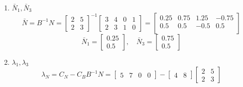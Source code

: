 \documentclass[../../main.tex]{subfiles}
\begin{document}
\begin{solution}
\begin{enumerate}
\begin{equation*}
              \end{equation*}
        \item \(\bar{N}_1,\bar{N}_3\)
              \begin{equation*}
                  \bar{N} = B^{-1}N =
                  \begin{bmatrix}
                      2 & 5 \\
                      2 & 3
                  \end{bmatrix}^{-1}
                  \begin{bmatrix}
                      3 & 4 & 0 & 1 \\
                      2 & 3 & 1 & 0
                  \end{bmatrix}
                  =
                  \begin{bmatrix}
                      0.25 & 0.75 & 1.25 & -0.75 \\
                      0.5  & 0.5  & -0.5 & 0.5   \\
                  \end{bmatrix}
              \end{equation*}
              \begin{equation*}
                  \bar{N}_1 = \begin{bmatrix}
                      0.25 \\
                      0.5
                  \end{bmatrix}
                  ,\quad
                  \bar{N}_3 = \begin{bmatrix}
                      0.75 \\
                      0.5
                  \end{bmatrix}
              \end{equation*}
        \item \(\lambda_1,\lambda_3\)
              \begin{equation*}
                  \lambda_N = C_N - C_BB^{-1}N =
                  \begin{bmatrix}
                      5 & 7 & 0 & 0
                  \end{bmatrix}
                  -
                  \begin{bmatrix}
                      4 & 8
                  \end{bmatrix}
                  \begin{bmatrix}
                      2 & 5 \\
                      2 & 3

\end{bmatrix}
\end{equation*}
\end{enumerate}
\end{solution}
\end{document}
